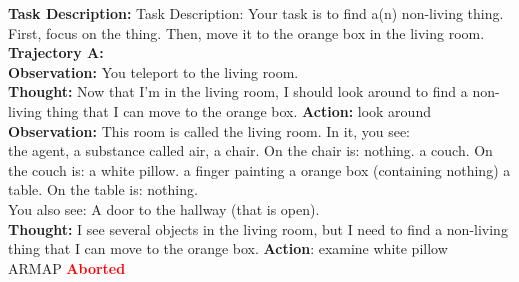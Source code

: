 \begin{tcolorbox}[breakable,title=Qualitative Visualization for ScienceWorld]
\textcolor{my_blue!50}{\textbf{Task Description:} Task Description: Your task is to find a(n) non-living thing. First, focus on the thing. Then, move it to the orange box in the living room.}\\
\textcolor{my_green!50}{\textbf{Trajectory A:} }\\
\textcolor{my_blue!50}{\textbf{Observation:}
You teleport to the living room.}\\
\textcolor{my_purple}{\textbf{Thought:} Now that I'm in the living room, I should look around to find a non-living thing that I can move to the orange box.  \textbf{Action:} look around}\\
\textcolor{my_blue!50}{\textbf{Observation:} This room is called the living room. In it, you see: \\ the agent, a substance called air, a chair. On the chair is: nothing. a couch. On the couch is: a white pillow. a finger painting a orange box (containing nothing) a table. On the table is: nothing. \\You also see: A door to the hallway (that is open). }\\
\textcolor{my_purple}{\textbf{Thought:} I see several objects in the living room, but I need to find a non-living thing that I can move to the orange box.   \textbf{Action}: examine white pillow}\\
ARMAP \textcolor{red}{\textbf{Aborted}}\\


\end{tcolorbox}
